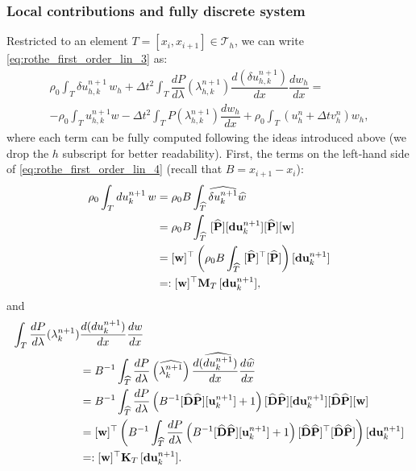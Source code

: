 \documentclass{sfuthesis}
\numberwithin{equation}{section}
\numberwithin{figure}{chapter}
\numberwithin{table}{chapter}
\theoremstyle{definition}
\def\*#1{{\mathbf{#1}}} %
\newcommand{\der}[2]{\dfrac{d #1}{d #2}}
\begin{document}
\subsubsection*{Local contributions and fully discrete system}

Restricted to an element $T = [x_i,x_{i+1}] \in \mathcal{T}_h$, we can write \eqref{eq:rothe_first_order_lin_3} as:
\begin{multline} \label{eq:rothe_first_order_lin_4}
	\rho_0 \int_T \delta u_{h,k}^{n+1} \, w_h + \Delta t^2 \int_T \der{P}{\lambda}(\lambda_{h,k}^{n+1}) \der{(\delta u_{h,k}^{n+1})}{x} \der{w_h}{x} = \\
	-\rho_0 \int_T u_{h,k}^{n+1} w - \Delta t^2 \int_T P(\lambda_{h,k}^{n+1}) \der{w_h}{x} + \rho_0 \int_T (u_h^n+\Delta t v_h^n) w_h,
\end{multline}
where each term can be fully computed following the ideas introduced above (we drop the $h$ subscript for better readability). First, the terms on the left-hand side of \eqref{eq:rothe_first_order_lin_4} (recall that $B=x_{i+1}-x_i$):
\begin{align}
    \rho_0 \int_T du_{k}^{n+1} \, w 
    \notag &= \rho_0 B \int_{\widehat{T}} \widehat{\delta u_k^{n+1}} \widehat{w}  \\
    \notag &= \rho_0 B \int_{\widehat{T}} \ [\widehat{\*P}][\*d\*u_k^{n+1}] [\widehat{\*P}][\*w] \\
    \notag &= [\*w]^\top \left( \rho_0 B \int_{\widehat{T}} \ [\widehat{\*P}]^\top [\widehat{\*P}] \right) [\*d\*u_k^{n+1}] \\
    &=: [\*w]^\top \*M_T  \, [\*d\*u_k^{n+1}],
\end{align}
and
\begin{align}
    \int_T \der{P}{\lambda}(\lambda_{k}^{n+1}) &\der{(du_{k}^{n+1})}{x} \der{w}{x} \notag\\
    \notag &= B^{-1} \int_{\widehat{T}} \der{P}{\lambda}\left(\widehat{\lambda_{k}^{n+1}}\right) \der{(\widehat{du_{k}^{n+1}})}{x} \der{\widehat{w}}{x} \\
    \notag &=  B^{-1} \int_{\widehat{T}} \der{P}{\lambda}\left( B^{-1} [\widehat{\*D} \widehat{\*P}] [\*u_k^{n+1}] + 1 \right) [\widehat{\*D}\widehat{\*P}][\*d\*u_{k}^{n+1}][\widehat{\*D}\widehat{\*P}] [\*w] \\
    \notag &= [\*w]^\top  \left(  B^{-1} \int_{\widehat{T}}\der{P}{\lambda}\left( B^{-1} [\widehat{\*D} \widehat{\*P}] [\*u_k^{n+1}] + 1 \right) [\widehat{\*D}\widehat{\*P}]^\top [\widehat{\*D}\widehat{\*P}] \right) [\*d\*u_{k}^{n+1}] \\
    &=: [\*w]^\top \*K_T \, [\*d\*u_{k}^{n+1}].
\end{align}
\end{document}
